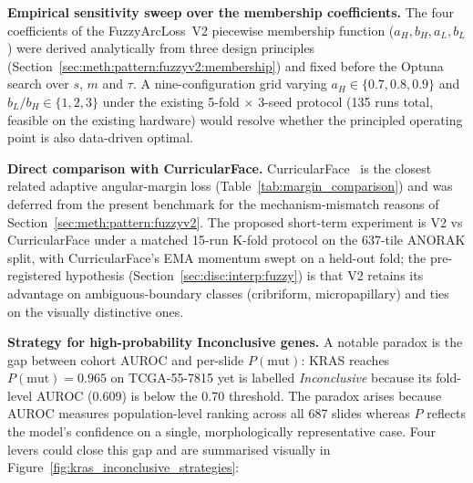 \textbf{Empirical sensitivity sweep over the membership coefficients.}
The four coefficients of the FuzzyArcLoss~V2 piecewise membership
function ($a_H, b_H, a_L, b_L$) were derived analytically from
three design principles
(Section~\ref{sec:meth:pattern:fuzzyv2:membership}) and fixed
before the Optuna search over $s$, $m$ and $\tau$.
A nine-configuration grid varying $a_H \in \{0.7, 0.8, 0.9\}$ and
$b_L/b_H \in \{1, 2, 3\}$ under the existing 5-fold $\times$ 3-seed
protocol (135 runs total, feasible on the existing hardware) would
resolve whether the principled operating point is also data-driven
optimal.

\textbf{Direct comparison with CurricularFace.}
CurricularFace~\cite{huang2020curricularface} is the closest
related adaptive angular-margin loss
(Table~\ref{tab:margin_comparison}) and was deferred from the
present benchmark for the mechanism-mismatch reasons of
Section~\ref{sec:meth:pattern:fuzzyv2}.
The proposed short-term experiment is V2 vs CurricularFace under
a matched 15-run K-fold protocol on the 637-tile ANORAK split,
with CurricularFace's EMA momentum swept on a held-out fold; the
pre-registered hypothesis (Section~\ref{sec:disc:interp:fuzzy})
is that V2 retains its advantage on ambiguous-boundary classes
(cribriform, micropapillary) and ties on the visually distinctive
ones.

\textbf{Strategy for high-probability Inconclusive genes.}
A notable paradox is the gap between cohort AUROC and per-slide
$P(\text{mut})$: KRAS reaches $P(\text{mut}) = 0.965$ on
TCGA-55-7815 yet is labelled \emph{Inconclusive} because its
fold-level AUROC (0.609) is below the 0.70 threshold.
The paradox arises because AUROC measures population-level
ranking across all 687 slides whereas $P$ reflects the model's
confidence on a single, morphologically representative case.
Four levers could close this gap and are summarised visually in
Figure~\ref{fig:kras_inconclusive_strategies}:

